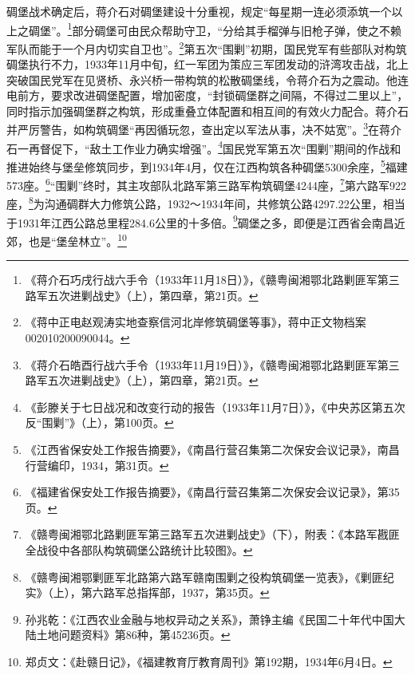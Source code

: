 碉堡战术确定后，蒋介石对碉堡建设十分重视，规定“每星期一连必须添筑一个以上之碉堡”。\footnote{《蒋介石巧戌行战六手令（1933年11月18日）》，《赣粤闽湘鄂北路剿匪军第三路军五次进剿战史》（上），第四章，第21页。}部分碉堡可由民众帮助守卫，“分给其手榴弹与旧枪子弹，使之不赖军队而能于一个月内切实自卫也”。\footnote{《蒋中正电赵观涛实地查察信河北岸修筑碉堡等事》，蒋中正文物档案002010200090044。}第五次“围剿”初期，国民党军有些部队对构筑碉堡执行不力，1933年11月中旬，红一军团为策应三军团发动的浒湾攻击战，北上突破国民党军在见贤桥、永兴桥一带构筑的松散碉堡线，令蒋介石为之震动。他连电前方，要求改进碉堡配置，增加密度，“封锁碉堡群之间隔，不得过二里以上”，同时指示加强碉堡群之构筑，形成重叠立体配置和相互间的有效火力配合。蒋介石并严厉警告，如构筑碉堡“再因循玩忽，查出定以军法从事，决不姑宽”。\footnote{《蒋介石皓酉行战六手令（1933年11月19日）》，《赣粤闽湘鄂北路剿匪军第三路军五次进剿战史》（上），第四章，第21页。}在蒋介石一再督促下，“敌土工作业力确实增强”。\footnote{《彭滕关于七日战况和改变行动的报告（1933年11月7日）》，《中央苏区第五次反“围剿”》（上），第100页。}国民党军第五次“围剿”期间的作战和推进始终与堡垒修筑同步，到1934年4月，仅在江西构筑各种碉堡5300余座，\footnote{《江西省保安处工作报告摘要》，《南昌行营召集第二次保安会议记录》，南昌行营编印，1934，第31页。}福建573座。\footnote{《福建省保安处工作报告摘要》，《南昌行营召集第二次保安会议记录》，第35页。}“围剿”终时，其主攻部队北路军第三路军构筑碉堡4244座，\footnote{《赣粤闽湘鄂北路剿匪军第三路军五次进剿战史》（下），附表：《本路军戡匪全战役中各部队构筑碉堡公路统计比较图》。}第六路军922座，\footnote{《赣粤闽湘鄂剿匪军北路第六路军赣南围剿之役构筑碉堡一览表》，《剿匪纪实》（上），第六路军总指挥部，1937，第35页。}为沟通碉群大力修筑公路，1932～1934年间，共修筑公路4297.22公里，相当于1931年江西公路总里程284.6公里的十多倍。\footnote{孙兆乾：《江西农业金融与地权异动之关系》，萧铮主编《民国二十年代中国大陆土地问题资料》第86种，第45236页。}碉堡之多，即便是江西省会南昌近郊，也是“堡垒林立”。\footnote{郑贞文：《赴赣日记》，《福建教育厅教育周刊》第192期，1934年6月4日。}


